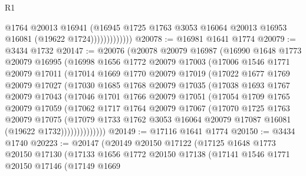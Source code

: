 \begin{lexlean}{R1}
\begin{coremodule}
                          @1764
                          @20013
                          @16941
                          (@16945
                            @1725
                            @1763
                            @3053
                            @16064
                            @20013
                            @16953
                            @16081
                            (@19622 @1724)))))))))))))
@20078 := @16981 @1641 @1774
@20079 := @3434 @1732
@20147 := @20076
    (@20078
      @20079
      @16987
      (@16990
        @1648
        @1773
        @20079
        @16995
        (@16998
          @1656
          @1772
          @20079
          @17003
          (@17006
            @1546
            @1771
            @20079
            @17011
            (@17014
              @1669
              @1770
              @20079
              @17019
              (@17022
                @1677
                @1769
                @20079
                @17027
                (@17030
                  @1685
                  @1768
                  @20079
                  @17035
                  (@17038
                    @1693
                    @1767
                    @20079
                    @17043
                    (@17046
                      @1701
                      @1766
                      @20079
                      @17051
                      (@17054
                        @1709
                        @1765
                        @20079
                        @17059
                        (@17062
                          @1717
                          @1764
                          @20079
                          @17067
                          (@17070
                            @1725
                            @1763
                            @20079
                            @17075
                            (@17079
                              @1733
                              @1762
                              @3053
                              @16064
                              @20079
                              @17087
                              @16081
                              (@19622 @1732))))))))))))))
@20149 := @17116 @1641 @1774
@20150 := @3434 @1740
@20223 := @20147
    (@20149
      @20150
      @17122
      (@17125
        @1648
        @1773
        @20150
        @17130
        (@17133
          @1656
          @1772
          @20150
          @17138
          (@17141
            @1546
            @1771
            @20150
            @17146
            (@17149
              @1669

\end{coremodule}
\end{lexlean}
